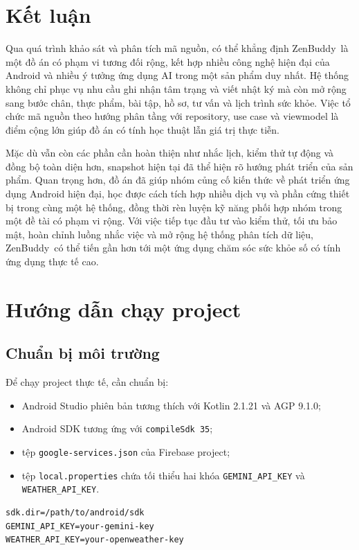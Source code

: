 \documentclass{zenbuddy-report}
\newcommand{\appname}{ZenBuddy}
\begin{document}
\chapter{Kết luận}
Qua quá trình khảo sát và phân tích mã nguồn, có thể khẳng định \appname\ là một đồ án có phạm vi tương đối rộng, kết hợp nhiều công nghệ hiện đại của Android và nhiều ý tưởng ứng dụng AI trong một sản phẩm duy nhất. Hệ thống không chỉ phục vụ nhu cầu ghi nhận tâm trạng và viết nhật ký mà còn mở rộng sang bước chân, thực phẩm, bài tập, hồ sơ, tư vấn và lịch trình sức khỏe. Việc tổ chức mã nguồn theo hướng phân tầng với repository, use case và viewmodel là điểm cộng lớn giúp đồ án có tính học thuật lẫn giá trị thực tiễn.

Mặc dù vẫn còn các phần cần hoàn thiện như nhắc lịch, kiểm thử tự động và đồng bộ toàn diện hơn, snapshot hiện tại đã thể hiện rõ hướng phát triển của sản phẩm. Quan trọng hơn, đồ án đã giúp nhóm củng cố kiến thức về phát triển ứng dụng Android hiện đại, học được cách tích hợp nhiều dịch vụ và phần cứng thiết bị trong cùng một hệ thống, đồng thời rèn luyện kỹ năng phối hợp nhóm trong một đề tài có phạm vi rộng. Với việc tiếp tục đầu tư vào kiểm thử, tối ưu bảo mật, hoàn chỉnh luồng nhắc việc và mở rộng hệ thống phân tích dữ liệu, \appname\ có thể tiến gần hơn tới một ứng dụng chăm sóc sức khỏe số có tính ứng dụng thực tế cao.

\appendix

\chapter{Hướng dẫn chạy project}

\section{Chuẩn bị môi trường}
Để chạy project thực tế, cần chuẩn bị:
\begin{itemize}
  \item Android Studio phiên bản tương thích với Kotlin 2.1.21 và AGP 9.1.0;
  \item Android SDK tương ứng với \texttt{compileSdk 35};
  \item tệp \texttt{google-services.json} của Firebase project;
  \item tệp \texttt{local.properties} chứa tối thiểu hai khóa \texttt{GEMINI\_API\_KEY} và \texttt{WEATHER\_API\_KEY}.
\end{itemize}

\begin{lstlisting}[caption={Ví dụ tối thiểu cho local.properties},label={lst:local-properties}]
sdk.dir=/path/to/android/sdk
GEMINI_API_KEY=your-gemini-key
WEATHER_API_KEY=your-openweather-key
\end{lstlisting}
\end{document}
